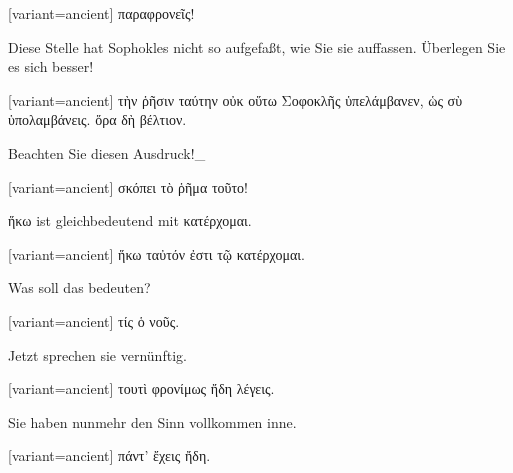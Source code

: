 \begin{greek}[variant=ancient]%
παραφρονεῖς!

\end{greek}%
\switchcolumn*

Diese Stelle hat Sophokles nicht so aufgefaßt, wie Sie sie auffassen.
Überlegen Sie es sich besser! 

\switchcolumn

\begin{greek}[variant=ancient]%
τὴν ῥῆσιν ταύτην οὐκ οὕτω Σοφοκλῆς ὑπελάμβανεν, ὡς σὺ ὑπολαμβάνεις.
ὅρα δὴ βέλτιον.

\end{greek}%
\switchcolumn*

Beachten Sie diesen Aus\textcompwordmark{}druck!\_

\switchcolumn

\begin{greek}[variant=ancient]%
σκόπει τὸ ῥῆμα τοῦτο!

\end{greek}%
\switchcolumn*

\textgreek[variant=ancient]{ἥκω} ist gleichbedeutend mit \textgreek[variant=ancient]{κατέρχομαι.} 

\switchcolumn

\begin{greek}[variant=ancient]%
ἥκω ταὐτόν ἐστι τῷ κατέρχομαι.

\end{greek}%
\switchcolumn*

Was soll das bedeuten? 

\switchcolumn

\begin{greek}[variant=ancient]%
τίς ὁ νοῦς.

\end{greek}%
\switchcolumn*

Jetzt sprechen sie vernünftig. 

\switchcolumn

\begin{greek}[variant=ancient]%
τουτὶ φρονίμως ἤδη λέγεις.

\end{greek}%
\switchcolumn*

Sie haben nunmehr den Sinn vollkommen inne. 

\switchcolumn

\begin{greek}[variant=ancient]%
πάντ' ἔχεις ἤδη.

\end{greek}%
\switchcolumn*

